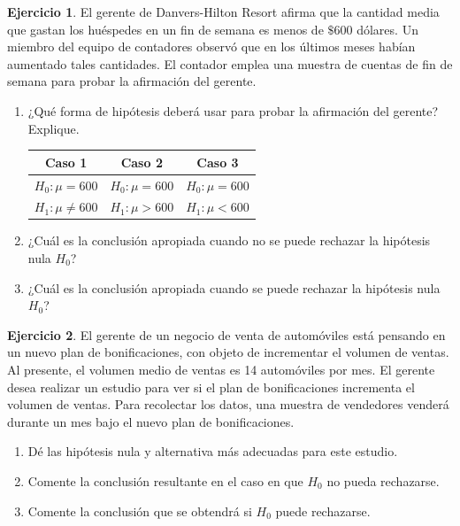 \documentclass[
]{book}
\providecommand{\tightlist}{%
  \setlength{\itemsep}{0pt}\setlength{\parskip}{0pt}}
\theoremstyle{definition}
\theoremstyle{definition}
\theoremstyle{definition}
\newtheorem{exercise}{Ejercicio}[chapter]
\theoremstyle{definition}
\theoremstyle{remark}
\begin{document}
\begin{exercise}

El gerente de Danvers-Hilton Resort afirma que la cantidad media que gastan los huéspedes en un fin de semana es menos de \(\$600\) dólares. Un miembro del equipo de contadores observó que en los últimos meses habían aumentado tales cantidades. El contador emplea una muestra de cuentas de fin de semana para probar la afirmación del gerente.

\begin{enumerate}
\def\labelenumi{\alph{enumi}.}
\tightlist
\item
  ¿Qué forma de hipótesis deberá usar para probar la afirmación del gerente? Explique.

  \begin{table}[H]
  \centering
  \begin{tabular}{ccc}
  \toprule
  Caso 1 & Caso 2 & Caso 3\\
  \midrule
  $H_0: \mu = 600$ & $H_0: \mu = 600$ & $H_0: \mu = 600$\\
  $H_1: \mu \neq 600$ & $H_1: \mu > 600$ & $H_1:\mu < 600$\\
  \bottomrule
  \end{tabular}
  \end{table}
\item
  ¿Cuál es la conclusión apropiada cuando no se puede rechazar la hipótesis nula \(H_0\)?
\item
  ¿Cuál es la conclusión apropiada cuando se puede rechazar la hipótesis nula \(H_0\)?
\end{enumerate}

\end{exercise}

\begin{exercise}

El gerente de un negocio de venta de automóviles está pensando en un nuevo plan de bonificaciones, con objeto de incrementar el volumen de ventas. Al presente, el volumen medio de ventas es 14 automóviles por mes. El gerente desea realizar un estudio para ver si el plan de
bonificaciones incrementa el volumen de ventas. Para recolectar los datos, una muestra de vendedores venderá durante un mes bajo el nuevo plan de bonificaciones.

\begin{enumerate}
\def\labelenumi{\alph{enumi}.}
\tightlist
\item
  Dé las hipótesis nula y alternativa más adecuadas para este estudio.
\item
  Comente la conclusión resultante en el caso en que \(H_0\) no pueda rechazarse.
\item
  Comente la conclusión que se obtendrá si \(H_0\) puede rechazarse.
\end{enumerate}

\end{exercise}
\end{document}
